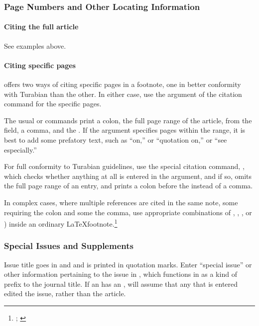 \documentclass{ltxdockit}[2010/02/12]
\begin{document}
\subsubsection{Page Numbers and Other Locating Information}

\paragraph{Citing the full article} See examples above.

\paragraph{Citing specific pages}

 offers two ways of citing specific pages in a footnote, one in better conformity with Turabian than the other. In either case, use the  argument of the citation command for the specific pages. 

The usual  or  commands print a colon, the full page range of the article, from the  field, a comma, and the . If the  argument specifies pages within the range, it is best to add some prefatory text, such as ``on,'' or ``quotation on,'' or ``see especially.''\autocites[][on 250]{2914}

For full conformity to Turabian guidelines, use the special  citation command, , which  checks whether anything at all is entered in the  argument, and if so, omits the full page range of an  entry, and prints a colon before the  instead of a comma.



In complex cases, where multiple references are cited in the same note, some requiring the colon and some the comma, use appropriate combinations of , , , or ) inside an ordinary \LaTeX footnote.\footnote{; \cite{corsi1988the-age-of-lamarck}}


\subsubsection{Special Issues and Supplements}

Issue title goes in  and  and is printed in quotation marks. Enter \enquote{special issue} or other information pertaining to the issue in , which functions in  as a kind of prefix to the journal title.
If an  has an ,  will assume that any  that is entered edited the issue, rather than the article.
\end{document}
